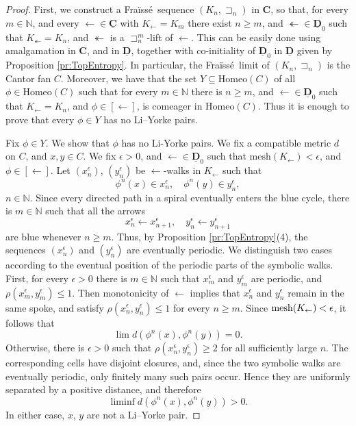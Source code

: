 \documentclass[12pt]{amsart}
\numberwithin{equation}{section}
\theoremstyle{plain}
\theoremstyle{definition}
\newcommand \Homeo{ \mbox{Homeo}}
\newcommand \mesh{{\rm{ mesh}}}
\newcommand \sqsp{\sqsupset}
\newcommand \la{\leftarrow}
\newcommand \fra{Fra\"{i}ss\'{e}}
\newcommand \CCb{\mathbf{C}}
\newcommand \CCub{\underline{\mathbf{C}}}
\newcommand \DDub{\underline{\mathbf{D}}}
\newcommand \NN{\mathbb{N}}
\begin{document}
\begin{proof}
First, we construct a \fra \ sequence $(K_n, \sqsp_n)$ in $\CCb$, so that, for every $m \in \NN$, and every $\la \in \CCub$ with $K_\la=K_m$ there exist $n \geq m$, and $\twoheadleftarrow \in \DDub_0$ such that $K_\twoheadleftarrow=K_n$, and $\twoheadleftarrow$ is a $\sqsp^m_n$-lift of $\la$. This can be easily done using amalgamation in $\CCb$, and in $\DDub$, together with co-initiality of $\DDub_0$ in $\DDub$ given by Proposition \ref{pr:TopEntropy}. In particular, the \fra \ limit of $(K_n, \sqsp_n)$ is the Cantor fan $C$. Moreover, we have that the set $Y \subseteq \Homeo(C)$ of all $\phi \in \Homeo(C)$ such that for every $m \in \NN$ there is $n \geq m$, and $\la \in \DDub_0$ such that $K_\la=K_ n$, and $\phi \in [\la]$, is comeager in $ \Homeo(C)$. Thus it is enough to prove that every $\phi \in Y$ has no Li--Yorke pairs.

Fix $\phi \in Y$. We show that $\phi$ has no Li-Yorke pairs. We fix a compatible metric $d$ on $C$, and $x, y \in C$. We fix $\epsilon>0$, and $\la \in \DDub_0$ such that $\mbox{mesh}(K_\la)<\epsilon$, and $\phi \in [\la]$. Let $(x^\epsilon_n)$, $(y^\epsilon_n)$ be $\la$-walks in $K_\leftarrow$ such that $$\phi^n(x) \in x^\epsilon_n, \quad \phi^n(y) \in y^\epsilon_n,$$ $n \in \NN$. %
 Since every directed path in a spiral eventually enters the blue cycle, there is $m \in \NN$ such that all the arrows $$x_n^\epsilon \la x_{n+1}^\epsilon, \quad y_n^\epsilon \la y_{n+1}^\epsilon$$ are blue whenever $n \geq m$. Thus, by Proposition \ref{pr:TopEntropy}(4),  the sequences $(x^\epsilon_n)$ and $(y^\epsilon_n)$ are eventually periodic. We distinguish two cases according to the eventual position of the periodic parts of the symbolic walks. First, for every $\epsilon>0$ there is $m \in \NN$ such that $x^\epsilon_m$ and $y^\epsilon_m$ are periodic, and $\rho(x^\epsilon_m,y^\epsilon_m) \leq 1$. Then monotonicity of $\la$ implies that
$x^\epsilon_n$ and $y^\epsilon_n$ remain in the same spoke, and satisfy
$\rho(x^\epsilon_n,y^\epsilon_n)\le 1$ for every $n\ge m$. Since $\mesh(K_\la)<\epsilon$, it follows that $$\lim d(\phi^n(x),\phi^n(y))=0.$$ Otherwise, there is $\epsilon>0$ such that $\rho(x^\epsilon_n,y^\epsilon_n) \geq 2$ for all sufficiently large $n$. The corresponding cells have disjoint closures, and, since the two symbolic walks are eventually periodic, only finitely many such pairs occur. Hence they are uniformly separated by a positive distance, and therefore $$\liminf d(\phi^n(x),\phi^n(y))>0.$$ In either case, $x$, $y$ are not a Li--Yorke pair.
\end{proof}
\end{document}
